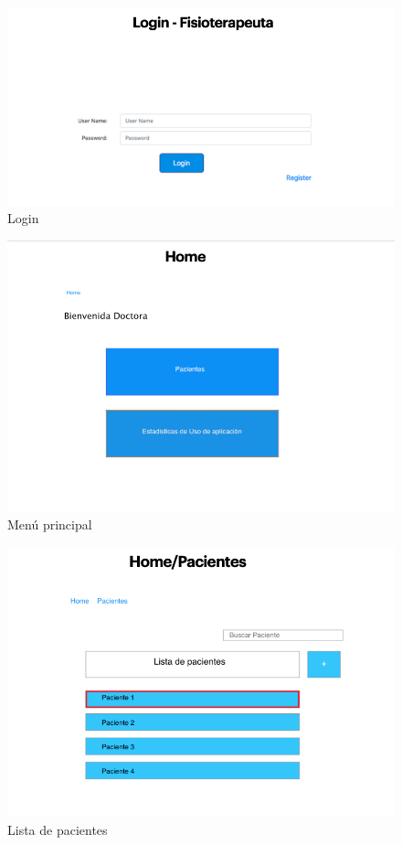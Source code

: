 \documentclass[12pt]{article}
\begin{document}
\begin{figure}[ht]
\centering
\includegraphics[scale=0.4]{imag/P1.png}
\caption{Login }
\label{6}
\end{figure}
\FloatBarrier

\begin{figure}[ht]
\centering
\includegraphics[scale=0.4]{imag/P3.png}
\caption{Menú principal }
\label{6}
\end{figure}
\FloatBarrier


\begin{figure}[ht]
\centering
\includegraphics[scale=0.4]{imag/P4.png}
\caption{Lista de pacientes }
\label{6}
\end{figure}
\FloatBarrier
\end{document}
